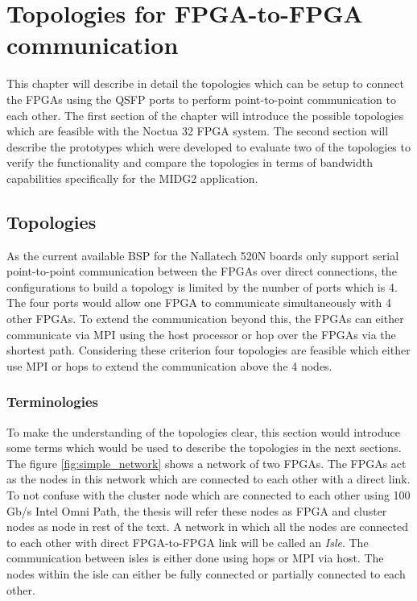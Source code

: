 \chapter{Topologies for FPGA-to-FPGA communication}
\label{cha:topologies}

This chapter will describe in detail the topologies which can be setup to
connect the FPGAs using the QSFP ports to perform point-to-point communication
to each other. The first section of the chapter will introduce the possible
topologies which are feasible with the Noctua 32 FPGA system. The second
section will describe the prototypes which were developed to evaluate two
of the topologies to verify the functionality and compare the topologies
in terms of bandwidth capabilities specifically for the MIDG2 application.

\section{Topologies}

As the current available BSP for the Nallatech 520N boards only support serial
point-to-point communication between the FPGAs over direct connections, the
configurations to build a topology is limited by the number of ports which is
4. The four ports would allow one FPGA to communicate simultaneously with 4
other FPGAs. To extend the communication beyond this, the FPGAs can either
communicate via MPI using the host processor or hop over the FPGAs via the
shortest path. Considering these criterion four topologies are feasible which
either use MPI or hops to extend the communication above the 4 nodes.


\subsection*{Terminologies}

To make the understanding of the topologies clear, this section would introduce
some terms which would be used to describe the topologies in the next sections.
The figure \ref{fig:simple_network} shows a network of two FPGAs.
The FPGAs act as the nodes in this network which are connected to each other
with a direct link. To not confuse with the cluster node which are connected to
each other using 100 Gb/s Intel Omni Path, the thesis will refer
these nodes as FPGA and cluster nodes as node in rest of the text. A network in
which all the nodes are connected to each other with direct FPGA-to-FPGA link
will be called an \textit{Isle}. The communication between isles is either done
using hops or MPI via host. The nodes within the isle can either be fully
connected or partially connected to each other.

